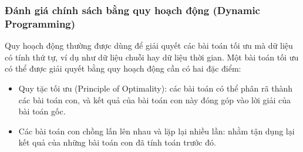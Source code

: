 \subsubsection{Đánh giá chính sách bằng quy hoạch động (Dynamic Programming)}
Quy hoạch động thường được dùng để giải quyết các bài toán tối ưu mà dữ liệu có tính thứ tự, ví dụ như dữ liệu chuỗi hay dữ liệu thời gian. Một bài toán tối ưu có thể được giải quyết bằng quy hoạch động cần có hai đặc điểm:
\begin{itemize}
	\item Quy tặc tối ưu (Principle of Optimality): các bài toán có thể phân rã thành các bài toán con, và kết quả của bài toán con này đóng góp vào lời giải của bài toán gốc.
	\item Các bài toán con chồng lấn lên nhau và lặp lại nhiều lần: nhằm tận dụng lại kết quả của những bài toán con đã tính toán trước đó.
\end{itemize}

